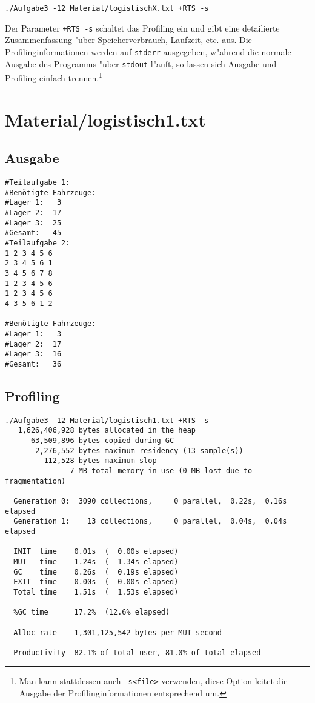 \documentclass{scrreprt}
\begin{document}
\begin{verbatim}
./Aufgabe3 -12 Material/logistischX.txt +RTS -s
\end{verbatim}

Der Parameter \texttt{+RTS -s} schaltet das Profiling ein und gibt eine
detailierte Zusammenfassung "uber Speicherverbrauch, Laufzeit, etc. aus.  Die
Profilinginformationen werden auf \texttt{stderr} ausgegeben, w"ahrend die
normale Ausgabe des Programms "uber \texttt{stdout} l"auft, so lassen sich
Ausgabe und Profiling einfach trennen.\footnote{Man kann stattdessen auch
\texttt{-s<file>} verwenden, diese Option leitet die Ausgabe der
Profilinginformationen entsprechend um.}

\section{Material/logistisch1.txt}

\subsection*{Ausgabe}

\begin{verbatim}
#Teilaufgabe 1:
#Benötigte Fahrzeuge:
#Lager 1:   3
#Lager 2:  17
#Lager 3:  25
#Gesamt:   45
#Teilaufgabe 2:
1 2 3 4 5 6
2 3 4 5 6 1
3 4 5 6 7 8
1 2 3 4 5 6
1 2 3 4 5 6
4 3 5 6 1 2

#Benötigte Fahrzeuge:
#Lager 1:   3
#Lager 2:  17
#Lager 3:  16
#Gesamt:   36
\end{verbatim}

\subsection*{Profiling}

\begin{verbatim}
./Aufgabe3 -12 Material/logistisch1.txt +RTS -s 
   1,626,406,928 bytes allocated in the heap
      63,509,896 bytes copied during GC
       2,276,552 bytes maximum residency (13 sample(s))
         112,528 bytes maximum slop
               7 MB total memory in use (0 MB lost due to fragmentation)

  Generation 0:  3090 collections,     0 parallel,  0.22s,  0.16s elapsed
  Generation 1:    13 collections,     0 parallel,  0.04s,  0.04s elapsed

  INIT  time    0.01s  (  0.00s elapsed)
  MUT   time    1.24s  (  1.34s elapsed)
  GC    time    0.26s  (  0.19s elapsed)
  EXIT  time    0.00s  (  0.00s elapsed)
  Total time    1.51s  (  1.53s elapsed)

  %GC time      17.2%  (12.6% elapsed)

  Alloc rate    1,301,125,542 bytes per MUT second

  Productivity  82.1% of total user, 81.0% of total elapsed
\end{verbatim}
\end{document}
